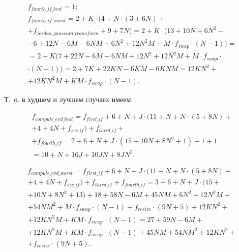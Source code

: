 \begin{equation}
	\begin{gathered}
		f_{fourth\_if\_best} = 1;\\
		f_{fourth\_if\_worst} = 2 + K \cdot (4 + N \cdot (3 + 6N) +\\+ f_{jordan\_gaussian\_transform} + 9 + 7N) = 2 + K \cdot (13 + 10N + 6N^2 -\\- 6 + 12N - 6M - 6NM + 6N^2 + 12N^2M + M \cdot f_{swap} \cdot (N - 1)) =\\= 2 + K (7 + 22N - 6M - 6NM + 12N^2 + 12N^2M + M \cdot f_{swap} \cdot\\\cdot (N-1)) = 2 + 7K + 22KN - 6KM - 6KNM =12KN^2 +\\+ 12KN^2M + KM \cdot f_{swap} \cdot (N - 1).
	\end{gathered}
\end{equation}

Т.~о. в худшем и лучшем случаях имеем:

\begin{equation}
	\begin{gathered}
		f_{compute\_evd\_best} = f_{first\_if} + 6 + N + J \cdot (11 + N + N \cdot (5 + 8N) + \\
		+ 4 + 4N + f_{sec\_if}) + f_{third\_if} +\\+ f_{fourth\_if} = 2 + 6 + N + J \cdot (15 + 10N + 8N^2 + 1) + 1 + 1 = \\
		= 10 + N + 16J + 10JN + 8JN^2.
	\end{gathered}
\end{equation}

\begin{equation}
	\begin{gathered}
		f_{compute\_evd\_worst} = f_{first\_if} + 6 + N + J \cdot (11 + N + N \cdot (5 + 8N) +\\+ 4 + 4N + f_{sec\_if}) + f_{third\_if} + f_{fourth\_if} = 
		3 + 6 + N + J \cdot (15 +\\+ 10N + 8N^2 + 13) + 18 + 58N - 6M + 45NM + 6N^2 + 12N^2M +\\+ 54NM^2 + M \cdot f_{swap} \cdot (N - 1) + f_{resize} \cdot (9N + 5)  + 12KN^2 +\\+ 12KN^2M + KM \cdot f_{swap} \cdot (N - 1) = 27 + 59N -6M +\\+ 12KN^2M + KM \cdot f_{swap} \cdot (N - 1) + 45NM + 54NM^2 + 12KN^2 +\\+
		f_{resize} \cdot (9N + 5).
	\end{gathered}
\end{equation}

